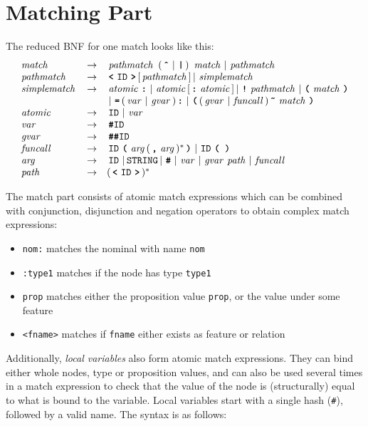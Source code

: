 \documentclass[11pt,a4paper]{report}
\newcommand{\cd}[1]{\texttt{#1}}
\begin{document}
\section{Matching Part}
\label{matching_part}
The reduced BNF for one match looks like this:
\[
\begin{array}{lcl}
\nt{match} & \rightarrow &
  \nt{pathmatch}\ (\tok{\^{}} \BAR  \tok{|} )\  \nt{match} \BAR
  \nt{pathmatch}\\
\nt{pathmatch} & \rightarrow &
  \tok{<} \id \tok{>} [ \nt{pathmatch} ] \BAR \nt{simplematch}\\
\nt{simplematch} & \rightarrow &
  \nt{atomic} \tok{:} \BAR
  \nt{atomic} [ \tok{:} \nt{atomic} ] \BAR
  \tok{!} \nt{pathmatch} \BAR
  \tok{(} \nt{match} \tok{)}\\
& & \BAR \tok{=} ( \nt{var} \BAR \nt{gvar} ) \tok{:} \BAR
    \tok{(} ( \nt{gvar} \BAR \nt{funcall} ) \tok{\~} \nt{match} \tok{)}\\
\nt{atomic} & \rightarrow & \id \BAR \nt{var}\\
\nt{var} & \rightarrow & \tok{\#}\!\!\id \\
\nt{gvar}  & \rightarrow & \tok{\#\#}\!\!\id \\
\nt{funcall} & \rightarrow &
  \id \tok{(} \nt{arg} (\tok{,} \nt{arg})^{*} \tok{)} \BAR
  \id \tok{( )} \\
\nt{arg} & \rightarrow &
  \id \BAR \mbox{\texttt{STRING}} \BAR \tok{\#} \BAR \nt{var}
  \BAR \nt{gvar} \nt{path} \BAR \nt{funcall}\\
\nt{path} & \rightarrow & (\tok{<} \id \tok{>})^{*}\\
\end{array}
\]

The match part consists of atomic match expressions which can be combined with
conjunction, disjunction and negation operators to obtain complex match
expressions:

\begin{itemize}
\item \cd{nom:} matches the nominal with name \cd{nom}
\item \cd{:type1} matches if the node has type \cd{type1}
\item \cd{prop} matches either the proposition value \cd{prop}, or the value
  under some feature
\item \cd{<fname>} matches if \cd{fname} either exists as feature or
  relation
\end{itemize}

Additionally, \emph{local variables} also form atomic match expressions. They
can bind either whole nodes, type or proposition values, and can also be used
several times in a match expression to check that the value of the node is
(structurally) equal to what is bound to the variable. Local variables start
with a single hash (\cd{\#}), followed by a valid name. The syntax is as
follows:
\end{document}
